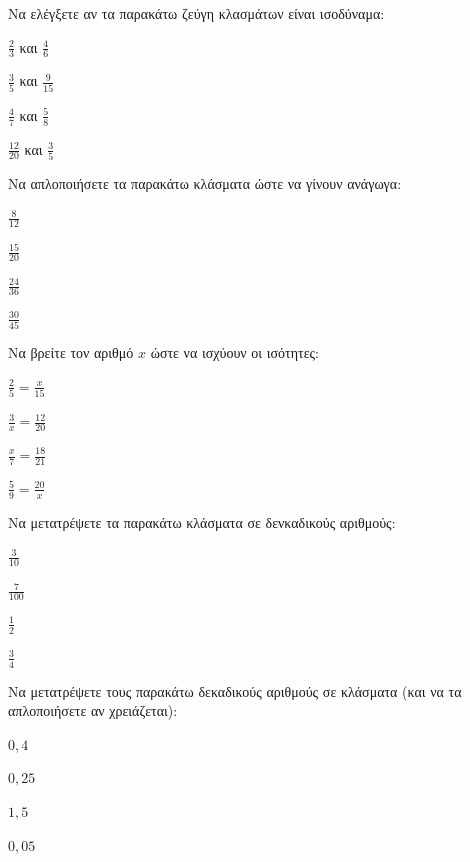 \documentclass[11pt,a4paper,modern]{FFExercises}
\begin{document}
    \askhsh Να ελέγξετε αν τα παρακάτω ζεύγη κλασμάτων είναι ισοδύναμα:
    \begin{alist}
        \item $\frac{2}{3}$ και $\frac{4}{6}$
        \item $\frac{3}{5}$ και $\frac{9}{15}$
        \item $\frac{4}{7}$ και $\frac{5}{8}$
        \item $\frac{12}{20}$ και $\frac{3}{5}$
    \end{alist}

    \askhsh Να απλοποιήσετε τα παρακάτω κλάσματα ώστε να γίνουν ανάγωγα:
    \begin{alist}
        \item $\frac{8}{12}$
        \item $\frac{15}{20}$
        \item $\frac{24}{36}$
        \item $\frac{30}{45}$
    \end{alist}

    \askhsh Να βρείτε τον αριθμό $x$ ώστε να ισχύουν οι ισότητες:
    \begin{alist}
        \item $\frac{2}{5} = \frac{x}{15}$
        \item $\frac{3}{x} = \frac{12}{20}$
        \item $\frac{x}{7} = \frac{18}{21}$
        \item $\frac{5}{9} = \frac{20}{x}$
    \end{alist}

    \askhsh Να μετατρέψετε τα παρακάτω κλάσματα σε δενκαδικούς αριθμούς:
    \begin{alist}
        \item $\frac{3}{10}$
        \item $\frac{7}{100}$
        \item $\frac{1}{2}$
        \item $\frac{3}{4}$
    \end{alist}

    \askhsh Να μετατρέψετε τους παρακάτω δεκαδικούς αριθμούς σε κλάσματα (και να τα απλοποιήσετε αν χρειάζεται):
    \begin{alist}
        \item $0,4$
        \item $0,25$
        \item $1,5$
        \item $0,05$
    \end{alist}
\end{document}
